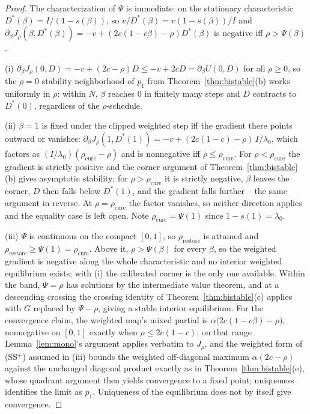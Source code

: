 \documentclass[11pt]{article}
\theoremstyle{definition}
\theoremstyle{remark}
\numberwithin{equation}{section}
\begin{document}
\begin{proof}
The characterization of $\Psi$ is immediate: on the stationary characteristic $D^\ast(\beta) = I/(1-s(\beta))$, so $v/D^\ast(\beta) = v(1-s(\beta))/I$ and $\partial_\beta J_\rho(\beta, D^\ast(\beta)) = -v + (2c(1-c\beta)-\rho)D^\ast(\beta)$ is negative iff $\rho > \Psi(\beta)$.

(i) $\partial_\beta J_\rho(0, D) = -v + (2c-\rho)D \le -v + 2cD = \partial_\beta U(0,D)$ for all $\rho \ge 0$, so the $\rho = 0$ stability neighborhood of $p_1$ from Theorem~\ref{thm:bistable}(b) works uniformly in $\rho$: within $N$, $\beta$ reaches $0$ in finitely many steps and $D$ contracts to $D^\ast(0)$, regardless of the $\rho$-schedule.

(ii) $\beta = 1$ is fixed under the clipped weighted step iff the gradient there points outward or vanishes: $\partial_\beta J_\rho(1, D^\ast(1)) = -v + (2c(1-c) - \rho)\,I/\lambda_0$, which factors as $(I/\lambda_0)(\rho_{\mathrm{cure}} - \rho)$ and is nonnegative iff $\rho \le \rho_{\mathrm{cure}}$. For $\rho < \rho_{\mathrm{cure}}$ the gradient is strictly positive and the corner argument of Theorem~\ref{thm:bistable}(b) gives asymptotic stability; for $\rho > \rho_{\mathrm{cure}}$ it is strictly negative, $\beta$ leaves the corner, $D$ then falls below $D^\ast(1)$, and the gradient falls further -- the same argument in reverse. At $\rho = \rho_{\mathrm{cure}}$ the factor vanishes, so neither direction applies and the equality case is left open. Note $\rho_{\mathrm{cure}} = \Psi(1)$ since $1-s(1) = \lambda_0$.

(iii) $\Psi$ is continuous on the compact $[0,1]$, so $\rho_{\mathrm{restore}}$ is attained and $\rho_{\mathrm{restore}} \ge \Psi(1) = \rho_{\mathrm{cure}}$. Above it, $\rho > \Psi(\beta)$ for every $\beta$, so the weighted gradient is negative along the whole characteristic and no interior weighted equilibrium exists; with (i) the calibrated corner is the only one available. Within the band, $\Psi = \rho$ has solutions by the intermediate value theorem, and at a descending crossing the crossing identity of Theorem~\ref{thm:bistable}(c) applies with $G$ replaced by $\Psi - \rho$, giving a stable interior equilibrium. For the convergence claim, the weighted map's mixed partial is $\alpha\bigl(2c(1-c\beta)-\rho\bigr)$, nonnegative on $[0,1]$ exactly when $\rho\le 2c(1-c)$; on that range Lemma~\ref{lem:mono}'s argument applies verbatim to $J_\rho$, and the weighted form of (SS$^+$) assumed in (iii) bounds the weighted off-diagonal maximum $\alpha(2c-\rho)$ against the unchanged diagonal product exactly as in Theorem~\ref{thm:bistable}(e), whose quadrant argument then yields convergence to a fixed point; uniqueness identifies the limit as $p_1$. Uniqueness of the equilibrium does not by itself give convergence.


\end{proof}
\end{document}
